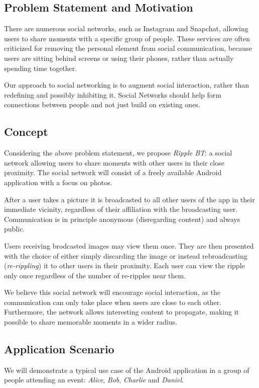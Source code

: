 \documentclass{report}
\begin{document}
\subsection{Problem Statement and Motivation}
There are numerous social networks, such as Instagram and Snapchat, allowing users to share moments with a specific group of people.
These services are often criticized for removing the personal element from social communication, because users are sitting behind screens or using their phones, rather than actually spending time together.

Our approach to social networking is to augment social interaction, rather than redefining and possibly inhibiting it. Social Networks should help form connections between people and not just build on existing ones.

\subsection{Concept}
Considering the above problem statement, we propose \textit{Ripple BT}: a social network allowing users to share moments with other users in their close proximity. The social network will consist of a freely available Android application with a focus on photos.

After a user takes a picture it is broadcasted to all other users of the app in their immediate vicinity, regardless of their affiliation with the broadcasting user. Communication is in principle anonymous (disregarding content) and always public.

Users receiving brodcasted images may view them once. They are then presented with the choice of either simply discarding the image or instead rebroadcasting (\textit{re-rippling}) it to other users in their proximity.
Each user can view the ripple only once regardless of the number of re-ripples near them.

We believe this social network will encourage social interaction, as the communication can only take place when users are close to each other. Furthermore, the network allows interesting content to propagate, making it possible to share memorable moments in a wider radius.

\subsection{Application Scenario}
We will demonstrate a typical use case of the Android application in a group of people attending an event: \textit{Alice}, \textit{Bob}, \textit{Charlie} and \textit{Daniel}.
\end{document}
